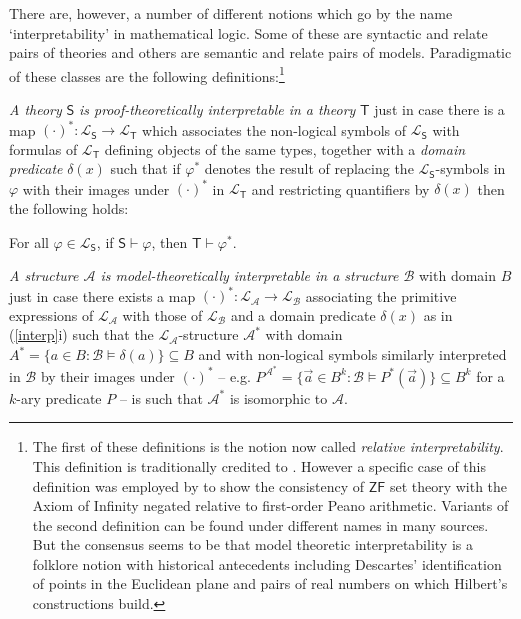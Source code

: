 \documentclass[11pt,fleqn,leqno]{article}
\def\phi{\varphi}
\def\proves{\vdash}
\begin{document}
There are, however, a number of different notions which go by the name `interpretability' in mathematical logic. Some of these are syntactic and relate pairs of theories  and others are semantic and relate pairs of models.  Paradigmatic of these classes are the following definitions:\footnote{The first of these definitions is the notion now called \textsl{relative interpretability}.  This definition is traditionally credited to \citet[\S I.V]{Tarski1953}.  However a specific case of this definition was employed by  \citet{Ackermann1937} to show the consistency of $\mathsf{ZF}$ set theory with the Axiom of Infinity negated relative to first-order Peano arithmetic. Variants of the second definition can be found under different names in many sources.  But the consensus seems to be that model theoretic interpretability is a folklore notion with  historical antecedents including Descartes' identification of points in the Euclidean plane and pairs of real numbers on which Hilbert's constructions build.}
\begin{example}
\label{interp}
\begin{compactenum}[i)]
\item \textsl{A theory} $\mathsf{S}$ \textsl{is proof-theoretically interpretable in a theory} $\mathsf{T}$ just in case there is a map $(\cdot)^*: \mathcal{L}_{\mathsf{S}} \rightarrow \mathcal{L}_{\mathsf{T}}$ which associates the non-logical symbols of $\mathcal{L}_{\mathsf{S}}$ with formulas of $\mathcal{L}_{\mathsf{T}}$ defining objects of the same types, together with a \textsl{domain predicate} $\delta(x)$ such that if $\phi^*$ denotes the result of replacing the $\mathcal{L}_{\mathsf{S}}$-symbols in $\phi$ with their images under $(\cdot)^*$ in $\mathcal{L}_{\mathsf{T}}$ and restricting quantifiers by $\delta(x)$ then the following holds:
\begin{center} For all $\phi \in \mathcal{L}_{\mathsf{S}}$, if $\mathsf{S} \proves \phi$, then $\mathsf{T} \proves \phi^*$.
\end{center}
\item \textsl{A structure $\mathcal{A}$ is model-theoretically interpretable in a structure $\mathcal{B}$} with domain $B$ just in case there exists a map $(\cdot)^*: \mathcal{L}_{\mathcal{A}} \rightarrow \mathcal{L}_{\mathcal{B}}$ associating the primitive expressions of $\mathcal{L}_{\mathcal{A}}$ with those of $\mathcal{L}_{\mathcal{B}}$ and a domain predicate $\delta(x)$ as in (\ref{interp}i) such that the $\mathcal{L}_{\mathcal{A}}$-structure $\mathcal{A}^*$ with domain $A^* = \{a \in B : \mathcal{B} \models \delta(a)\} \subseteq B$ and with non-logical symbols similarly interpreted in $\mathcal{B}$ by their images under $(\cdot)^*$ -- e.g. $P^{\mathcal{A}^*} = \{\vec{a} \in B^k : \mathcal{B} \models P^*(\vec{a})\} \subseteq B^k$ for a $k$-ary predicate $P$ --  is such that $\mathcal{A}^*$ is isomorphic to $\mathcal{A}$.
\end{compactenum}
\end{example}
\end{document}
